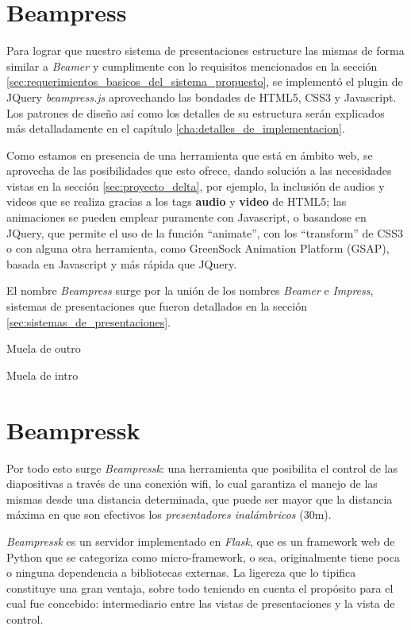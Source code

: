 	\section{Beampress} %
	\label{sec:beampress}
		Para lograr que nuestro sistema de presentaciones estructure las mismas de forma similar a \textit{Beamer} y cumplimente con lo requisitos mencionados en la sección \ref{sec:requerimientos_basicos_del_sistema_propuesto}, se implementó el plugin de JQuery \textit{beampress.js} aprovechando las bondades de HTML5, CSS3 y Javascript. Los patrones de diseño así como los detalles de su estructura serán explicados más detalladamente en el capítulo \ref{cha:detalles_de_implementacion}.

		Como estamos en presencia de una herramienta que está en ámbito web, se aprovecha de las posibilidades que esto ofrece, dando solución a las necesidades vistas en la sección \ref{sec:proyecto_delta}, por ejemplo, la inclusión de audios y videos que se realiza gracias a los tags \textbf{audio} y \textbf{video} de HTML5; las animaciones se pueden emplear puramente con Javascript, o basandose en JQuery, que permite el uso de la función ``animate'', con los ``transform'' de CSS3 o con alguna otra herramienta, como  GreenSock Animation Platform (GSAP), basada en Javascript y más rápida que JQuery. 

		El nombre \textit{Beampress} surge por la unión de los nombres \textit{Beamer} e \textit{Impress}, sistemas de presentaciones que fueron detallados en la sección \ref{sec:sistemas_de_presentaciones}.	


	Muela de outro


	Muela de intro
	
	\section{Beampressk} %
	\label{sec:beampressk}
		Por todo esto surge \textit{Beampressk}: una herramienta que posibilita el control de las diapositivas a través de una conexión wifi, lo cual garantiza el manejo de las mismas desde una distancia determinada, que puede ser mayor que la distancia máxima en que son efectivos los \textit{presentadores inalámbricos} (30m).

		\textit{Beampressk} es un servidor implementado en \textit{Flask}, que es un framework web de Python que se categoriza como micro-framework, o sea, originalmente tiene poca o ninguna dependencia a bibliotecas externas. La ligereza que lo tipifica constituye una gran ventaja, sobre todo teniendo en cuenta el propósito para el cual fue concebido: intermediario entre las vistas de presentaciones y la vista de control.

